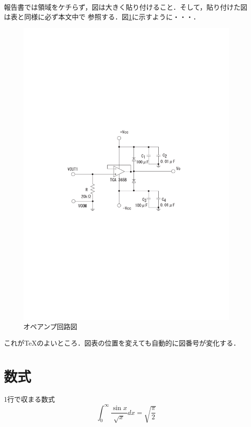 報告書では領域をケチらず，図は大きく貼り付けること．そして，貼り付けた図は表と同様に必ず本文中で
参照する．図\ref{amp}に示すように・・・．
\begin{figure}[htbp]
 \begin{center}
  \includegraphics[width = 14.0cm,pagebox=artbox]{./fig/drive_circuit.pdf}
 \end{center}
 \caption{オペアンプ回路図}
 \label{amp}
\end{figure}

これが\TeX のよいところ．図表の位置を変えても自動的に図番号が変化する．

\section{数式}
1行で収まる数式
\begin{equation}
 \int_0^\infty \frac{\sin x}{\sqrt{x}} dx = \sqrt{\frac{\pi}{2}}\label{eq1}
\end{equation}

